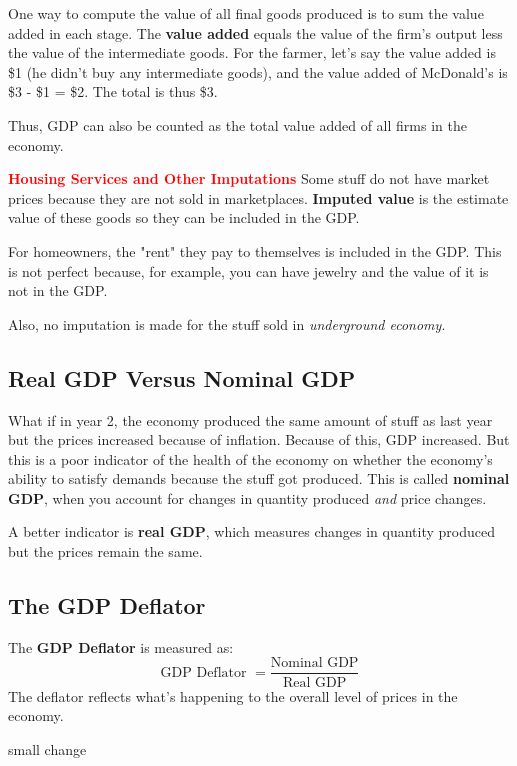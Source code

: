 \documentclass[12pt]{article}
\newcommand{\leadwords}[2]{\textcolor{red}{\textbf{\large #1}} #2}
\begin{document}
One way to compute the value of all final goods produced is to sum the value added in each stage. The \textbf{value added} equals the value of the firm's output less the value of the intermediate goods. For the farmer, let's say the value added is \$1 (he didn't buy any intermediate goods), and the value added of McDonald's is \$3 - \$1 = \$2. The total is thus \$3.

Thus, GDP can also be counted as the total value added of all firms in the economy.

\leadwords{Housing Services and Other Imputations} Some stuff do not have market prices because they are not sold in marketplaces. \textbf{Imputed value} is the estimate value of these goods so they can be included in the GDP.

For homeowners, the "rent" they pay to themselves is included in the GDP. This is not perfect because, for example, you can have jewelry and the value of it is not in the GDP.

Also, no imputation is made for the stuff sold in \textit{underground economy}.

\subsection{Real GDP Versus Nominal GDP}

What if in year 2, the economy produced the same amount of stuff as last year but the prices increased because of inflation. Because of this, GDP increased. But this is a poor indicator of the health of the economy on whether the economy's ability to satisfy demands because the stuff got produced. This is called \textbf{nominal GDP}, when you account for changes in quantity produced \textit{and} price changes.

A better indicator is \textbf{real GDP}, which measures changes in quantity produced but the prices remain the same.


\subsection{The GDP Deflator}

The \textbf{GDP Deflator} is measured as: $$\text{GDP Deflator } = \frac{\text{Nominal GDP}}{\text{Real GDP}}$$
The deflator reflects what's happening to the overall level of prices in the economy.

small change
\end{document}
